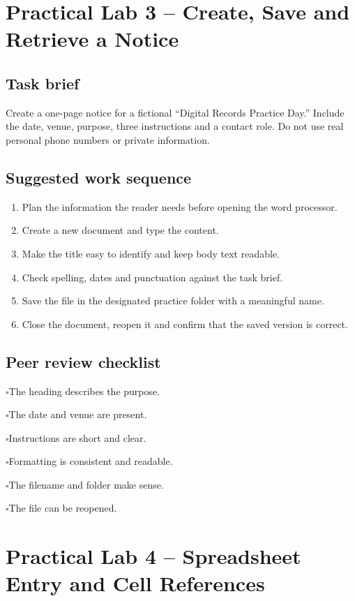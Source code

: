 \documentclass[11pt,openany,oneside]{book}
\newcommand{\checklistitem}{\noindent$\square$\quad}
\begin{document}
\chapter{Practical Lab 3 -- Create, Save and Retrieve a Notice}
\section{Task brief}
Create a one-page notice for a fictional “Digital Records Practice Day.” Include the date, venue, purpose, three instructions and a contact role. Do not use real personal phone numbers or private information.
\section{Suggested work sequence}
\begin{enumerate}
\item Plan the information the reader needs before opening the word processor.
\item Create a new document and type the content.
\item Make the title easy to identify and keep body text readable.
\item Check spelling, dates and punctuation against the task brief.
\item Save the file in the designated practice folder with a meaningful name.
\item Close the document, reopen it and confirm that the saved version is correct.
\end{enumerate}
\section{Peer review checklist}
\checklistitem The heading describes the purpose.\par
\checklistitem The date and venue are present.\par
\checklistitem Instructions are short and clear.\par
\checklistitem Formatting is consistent and readable.\par
\checklistitem The filename and folder make sense.\par
\checklistitem The file can be reopened.\par

\chapter{Practical Lab 4 -- Spreadsheet Entry and Cell References}
\end{document}
